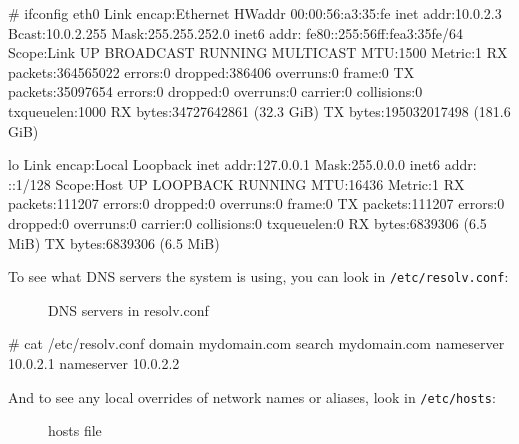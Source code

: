 \documentclass[10pt,american,]{book}
\newenvironment{Shaded}{\begin{snugshade}}{\end{snugshade}}
\newcommand{\KeywordTok}[1]{\textcolor[rgb]{0.13,0.29,0.53}{\textbf{{#1}}}}
\newcommand{\CommentTok}[1]{\textcolor[rgb]{0.56,0.35,0.01}{\textit{{#1}}}}
\newcommand{\NormalTok}[1]{{#1}}
\numberwithin{figure}{chapter}
\DeclareRobustCommand{\drcap}[1]{\begin{figure}[H]\caption{#1}\end{figure}}
\renewcommand{\KeywordTok}[1]{{#1}}
\renewcommand{\CommentTok}[1]{{#1}}
\renewcommand{\NormalTok}[1]{{#1}}
\begin{document}
\begin{Shaded}
\begin{Highlighting}[]
\CommentTok{# ifconfig}
\KeywordTok{eth0}      \NormalTok{Link encap:Ethernet  HWaddr 00:00:56:a3:35:fe}
          \KeywordTok{inet} \NormalTok{addr:10.0.2.3  Bcast:10.0.2.255  Mask:255.255.252.0}
          \KeywordTok{inet6} \NormalTok{addr: fe80::255:56ff:fea3:35fe/64 Scope:Link}
          \KeywordTok{UP} \NormalTok{BROADCAST RUNNING MULTICAST  MTU:1500  Metric:1}
          \KeywordTok{RX} \NormalTok{packets:364565022 errors:0 dropped:386406 overruns:0 frame:0}
          \KeywordTok{TX} \NormalTok{packets:35097654 errors:0 dropped:0 overruns:0 carrier:0}
          \KeywordTok{collisions}\NormalTok{:0 txqueuelen:1000}
          \KeywordTok{RX} \NormalTok{bytes:34727642861 (32.3 GiB)  }\KeywordTok{TX} \NormalTok{bytes:195032017498 (181.6 GiB)}

\KeywordTok{lo}        \NormalTok{Link encap:Local Loopback}
          \KeywordTok{inet} \NormalTok{addr:127.0.0.1  Mask:255.0.0.0}
          \KeywordTok{inet6} \NormalTok{addr: ::1/128 Scope:Host}
          \KeywordTok{UP} \NormalTok{LOOPBACK RUNNING  MTU:16436  Metric:1}
          \KeywordTok{RX} \NormalTok{packets:111207 errors:0 dropped:0 overruns:0 frame:0}
          \KeywordTok{TX} \NormalTok{packets:111207 errors:0 dropped:0 overruns:0 carrier:0}
          \KeywordTok{collisions}\NormalTok{:0 txqueuelen:0}
          \KeywordTok{RX} \NormalTok{bytes:6839306 (6.5 MiB)  }\KeywordTok{TX} \NormalTok{bytes:6839306 (6.5 MiB)}
\end{Highlighting}
\end{Shaded}

To see what DNS servers the system is using, you can look in
\texttt{/etc/resolv.conf}:

\drcap{DNS servers in resolv.conf}

\begin{Shaded}
\begin{Highlighting}[]
\CommentTok{# cat /etc/resolv.conf}
\KeywordTok{domain} \NormalTok{mydomain.com}
\KeywordTok{search} \NormalTok{mydomain.com}
\KeywordTok{nameserver} \NormalTok{10.0.2.1}
\KeywordTok{nameserver} \NormalTok{10.0.2.2}
\end{Highlighting}
\end{Shaded}

And to see any local overrides of network names or aliases, look in
\texttt{/etc/hosts}:

\drcap{hosts file}
\end{document}

